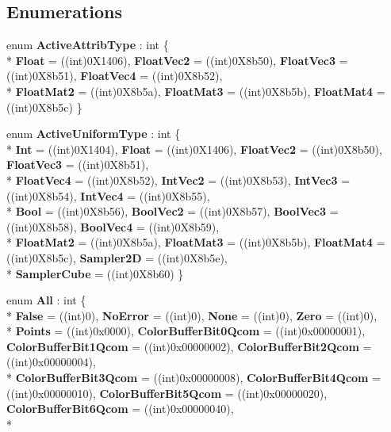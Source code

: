\subsection*{Enumerations}
\begin{DoxyCompactItemize}
\item 
enum {\bfseries Active\-Attrib\-Type} \-: int \{ \\*
{\bfseries Float} = ((int)0\-X1406), 
{\bfseries Float\-Vec2} = ((int)0\-X8b50), 
{\bfseries Float\-Vec3} = ((int)0\-X8b51), 
{\bfseries Float\-Vec4} = ((int)0\-X8b52), 
\\*
{\bfseries Float\-Mat2} = ((int)0\-X8b5a), 
{\bfseries Float\-Mat3} = ((int)0\-X8b5b), 
{\bfseries Float\-Mat4} = ((int)0\-X8b5c)
 \}
\item 
enum {\bfseries Active\-Uniform\-Type} \-: int \{ \\*
{\bfseries Int} = ((int)0\-X1404), 
{\bfseries Float} = ((int)0\-X1406), 
{\bfseries Float\-Vec2} = ((int)0\-X8b50), 
{\bfseries Float\-Vec3} = ((int)0\-X8b51), 
\\*
{\bfseries Float\-Vec4} = ((int)0\-X8b52), 
{\bfseries Int\-Vec2} = ((int)0\-X8b53), 
{\bfseries Int\-Vec3} = ((int)0\-X8b54), 
{\bfseries Int\-Vec4} = ((int)0\-X8b55), 
\\*
{\bfseries Bool} = ((int)0\-X8b56), 
{\bfseries Bool\-Vec2} = ((int)0\-X8b57), 
{\bfseries Bool\-Vec3} = ((int)0\-X8b58), 
{\bfseries Bool\-Vec4} = ((int)0\-X8b59), 
\\*
{\bfseries Float\-Mat2} = ((int)0\-X8b5a), 
{\bfseries Float\-Mat3} = ((int)0\-X8b5b), 
{\bfseries Float\-Mat4} = ((int)0\-X8b5c), 
{\bfseries Sampler2\-D} = ((int)0\-X8b5e), 
\\*
{\bfseries Sampler\-Cube} = ((int)0\-X8b60)
 \}
\item 
enum {\bfseries All} \-: int \{ \\*
{\bfseries False} = ((int)0), 
{\bfseries No\-Error} = ((int)0), 
{\bfseries None} = ((int)0), 
{\bfseries Zero} = ((int)0), 
\\*
{\bfseries Points} = ((int)0x0000), 
{\bfseries Color\-Buffer\-Bit0\-Qcom} = ((int)0x00000001), 
{\bfseries Color\-Buffer\-Bit1\-Qcom} = ((int)0x00000002), 
{\bfseries Color\-Buffer\-Bit2\-Qcom} = ((int)0x00000004), 
\\*
{\bfseries Color\-Buffer\-Bit3\-Qcom} = ((int)0x00000008), 
{\bfseries Color\-Buffer\-Bit4\-Qcom} = ((int)0x00000010), 
{\bfseries Color\-Buffer\-Bit5\-Qcom} = ((int)0x00000020), 
{\bfseries Color\-Buffer\-Bit6\-Qcom} = ((int)0x00000040), 
\\*

\end{DoxyCompactItemize}
